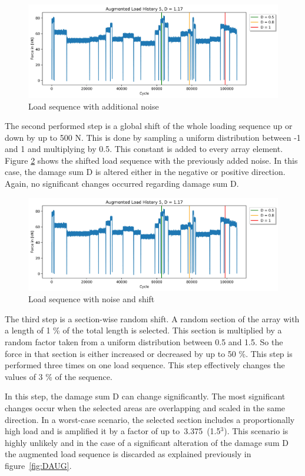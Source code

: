\begin{figure}[H]
	\centering
	\includegraphics[width=1\linewidth]{IMGs/Verlauf_5_noise.jpg}
	\caption{Load sequence with additional noise}
	\label{fig:V5_noise}
\end{figure}

The second performed step is a global shift of the whole loading sequence up or down by up to 500 N. This is done by sampling a uniform distribution between -1 and 1 and multiplying by 0.5. This constant is added to every array element. Figure \ref{fig:V5_shift} shows the shifted load sequence with the previously added noise. In this case, the damage sum D is altered either in the negative or positive direction. Again, no significant changes occurred regarding damage sum D.

\begin{figure}[H]
	\centering
	\includegraphics[width=1\linewidth]{IMGs/Verlauf_5_noise.jpg}
	\caption{Load sequence with noise and shift}
	\label{fig:V5_shift}
\end{figure}

The third step is a section-wise random shift. A random section of the array with a length of 1 \% of the total length is selected. This section is multiplied by a random factor taken from a uniform distribution between 0.5 and 1.5. So the force in that section is either increased or decreased by up to 50 \%. This step is performed three times on one load sequence. This step effectively changes the values of 3 \% of the sequence. 

In this step, the damage sum D can change significantly. The most significant changes occur when the selected areas are overlapping and scaled in the same direction. In a worst-case scenario, the selected section includes a proportionally high load and is amplified it by a factor of up to~3.375~(1.5\(^3\)). This scenario is highly unlikely and in the case of a significant alteration of the damage sum D the augmented load sequence is discarded as explained previously in figure~\ref{fig:DAUG}.
 
